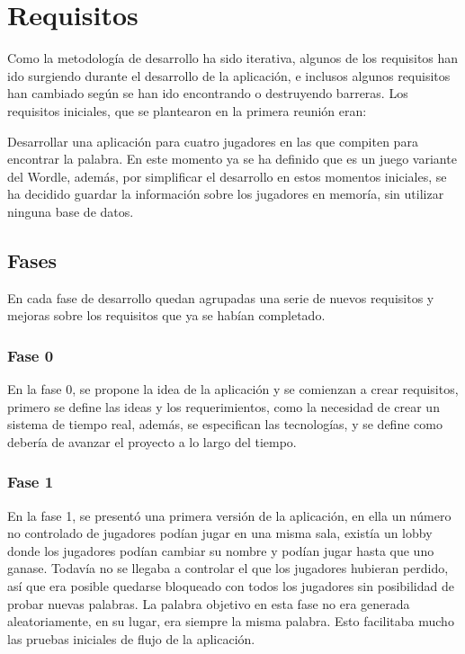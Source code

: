 \section{Requisitos}
Como la metodología de desarrollo ha sido iterativa, algunos de los requisitos han ido surgiendo durante el desarrollo de la aplicación, e inclusos algunos requisitos han cambiado según se han ido encontrando o destruyendo barreras. Los requisitos iniciales, que se plantearon en la primera reunión eran:

Desarrollar una aplicación para cuatro jugadores en las que compiten para encontrar la palabra. En este momento ya se ha definido que es un juego variante del Wordle, además, por simplificar el desarrollo en estos momentos iniciales, se ha decidido guardar la información sobre los jugadores en memoría, sin utilizar ninguna base de datos.

\subsection{Fases}
En cada fase de desarrollo quedan agrupadas una serie de nuevos requisitos y mejoras sobre los requisitos que ya se habían completado.

\subsubsection{Fase 0}
En la fase 0, se propone la idea de la aplicación y se comienzan a crear requisitos, primero se define las ideas y los requerimientos, como la necesidad de crear un sistema de tiempo real, además, se especifican las tecnologías, y se define como debería de avanzar el proyecto a lo largo del tiempo.

\subsubsection{Fase 1}
En la fase 1, se presentó una primera versión de la aplicación, en ella un número no controlado de jugadores podían jugar en una misma sala, existía un lobby donde los jugadores podían cambiar su nombre y podían jugar hasta que uno ganase. Todavía no se llegaba a controlar el que los jugadores hubieran perdido, así que era posible quedarse bloqueado con todos los jugadores sin posibilidad de probar nuevas palabras.
La palabra objetivo en esta fase no era generada aleatoriamente, en su lugar, era siempre la misma palabra. Esto facilitaba mucho las pruebas iniciales de flujo de la aplicación.

